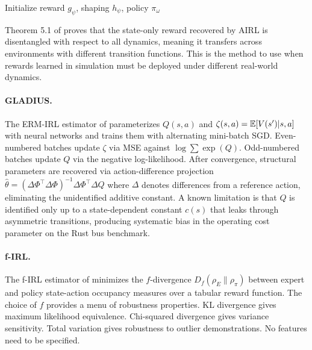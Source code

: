 \begin{algorithm}[H]
\DontPrintSemicolon
\caption{AIRL \citep{fu2018}}
\label{alg:airl}
Initialize reward $g_\psi$, shaping $h_\psi$, policy $\pi_\omega$\;
\end{algorithm}

Theorem 5.1 of \citet{fu2018} proves that the state-only reward recovered by AIRL is disentangled with respect to all dynamics, meaning it transfers across environments with different transition functions.
This is the method to use when rewards learned in simulation must be deployed under different real-world dynamics.

\paragraph{GLADIUS.}
The ERM-IRL estimator of \citet{kang2025} parameterizes $Q(s,a)$ and $\zeta(s,a) = \mathbb{E}[V(s')|s,a]$ with neural networks and trains them with alternating mini-batch SGD.
Even-numbered batches update $\zeta$ via MSE against $\log\sum\exp(Q)$.
Odd-numbered batches update $Q$ via the negative log-likelihood.
After convergence, structural parameters are recovered via action-difference projection $\hat\theta = (\Delta\Phi^\top\Delta\Phi)^{-1}\Delta\Phi^\top\Delta Q$ where $\Delta$ denotes differences from a reference action, eliminating the unidentified additive constant.
A known limitation is that $Q$ is identified only up to a state-dependent constant $c(s)$ that leaks through asymmetric transitions, producing systematic bias in the operating cost parameter on the Rust bus benchmark.

\paragraph{f-IRL.}
The f-IRL estimator of \citet{ni2022} minimizes the $f$-divergence $D_f(\rho_E \| \rho_\pi)$ between expert and policy state-action occupancy measures over a tabular reward function.
The choice of $f$ provides a menu of robustness properties.
KL divergence gives maximum likelihood equivalence.
Chi-squared divergence gives variance sensitivity.
Total variation gives robustness to outlier demonstrations.
No features need to be specified.

